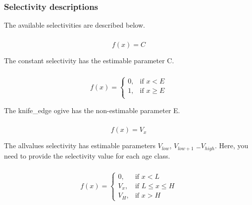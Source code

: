 \subsubsection{Selectivity descriptions}

The available selectivities are described below.

\subsubsection*{}

\begin{equation}
f(x)=C
\end{equation}

The constant selectivity has the estimable parameter C. 

\subsubsection*{}

\begin{equation}
f(x)= \begin{cases}
  0, & \text{if $x < E$} \\
  1, & \text{if $x \ge E$}\\ 
  \end{cases} 
\end{equation}

The knife\_edge ogive has the non-estimable parameter E.

\subsubsection*{}

\begin{equation}
f(x)=V_x
\end{equation}

The allvalues selectivity has estimable parameters $V_{low}$, $V_{low+1}$ \ldots $V_{high}$. Here, you need to provide the selectivity value for each age class.

\subsubsection*{}

\begin{equation}
f(x)=\begin{cases}
		 0, & \text{if $x < L$} \\
		 V_x, & \text{if $L \le x \le H$} \\
		 V_H, & \text{if $x > H$}
  \end{cases}
\end{equation}

